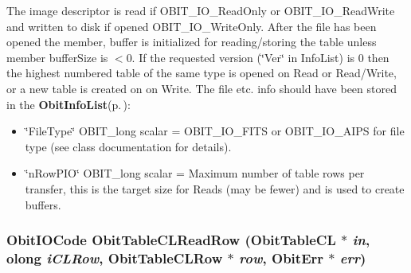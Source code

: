 The image descriptor is read if OBIT\_\-IO\_\-Read\-Only or OBIT\_\-IO\_\-Read\-Write and written to disk if opened OBIT\_\-IO\_\-Write\-Only. After the file has been opened the member, buffer is initialized for reading/storing the table unless member buffer\-Size is $<$0. If the requested version (\char`\"{}Ver\char`\"{} in Info\-List) is 0 then the highest numbered table of the same type is opened on Read or Read/Write, or a new table is created on on Write. The file etc. info should have been stored in the {\bf Obit\-Info\-List}{\rm (p.\,\pageref{structObitInfoList})}: \begin{itemize}
\item \char`\"{}File\-Type\char`\"{} OBIT\_\-long scalar = OBIT\_\-IO\_\-FITS or OBIT\_\-IO\_\-AIPS for file type (see class documentation for details). \item \char`\"{}n\-Row\-PIO\char`\"{} OBIT\_\-long scalar = Maximum number of table rows per transfer, this is the target size for Reads (may be fewer) and is used to create buffers. 
\end{itemize}
\subsubsection{\setlength{\rightskip}{0pt plus 5cm}Obit\-IOCode Obit\-Table\-CLRead\-Row ({\bf Obit\-Table\-CL} $\ast$ {\em in}, {\bf olong} {\em i\-CLRow}, {\bf Obit\-Table\-CLRow} $\ast$ {\em row}, {\bf Obit\-Err} $\ast$ {\em err})}\label{ObitTableCL_8h_a18}


